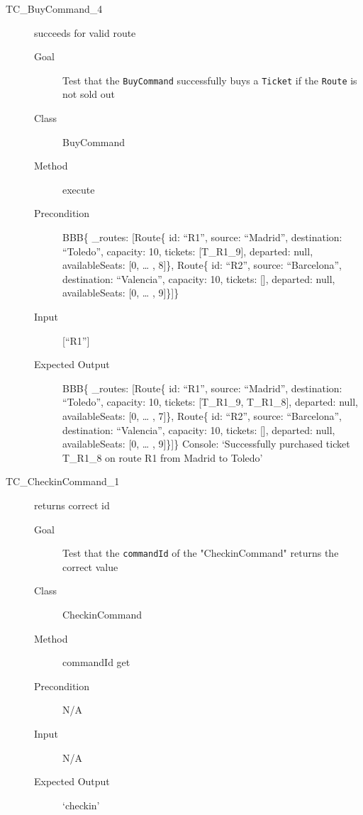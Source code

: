 \documentclass[11pt]{article}
\begin{document}
\begin{description}
\item[{TC\_BuyCommand\_4}] succeeds for valid route
\begin{description}
\item[{Goal}] Test that the \texttt{BuyCommand} successfully buys a \texttt{Ticket} if the \texttt{Route} is not sold out
\item[{Class}] BuyCommand
\item[{Method}] execute
\item[{Precondition}] BBB\{ \_routes: [Route\{ id: “R1”, source: “Madrid”, destination: “Toledo”, capacity: 10,  tickets: [T\_R1\_9], departed: null, availableSeats: [0, … , 8]\}, Route\{ id: “R2”, source: “Barcelona”, destination: “Valencia”, capacity: 10,  tickets: [], departed: null, availableSeats: [0, … , 9]\}]\}
\item[{Input}] [“R1”]
\item[{Expected Output}] BBB\{ \_routes: [Route\{ id: “R1”, source: “Madrid”, destination: “Toledo”, capacity: 10,  tickets: [T\_R1\_9, T\_R1\_8], departed: null, availableSeats: [0, … , 7]\}, Route\{ id: “R2”, source: “Barcelona”, destination: “Valencia”, capacity: 10,  tickets: [], departed: null, availableSeats: [0, … , 9]\}]\}
Console: ‘Successfully purchased ticket T\_R1\_8 on route R1 from Madrid to Toledo’
\end{description}

\item[{TC\_CheckinCommand\_1}] returns correct id
\begin{description}
\item[{Goal}] Test that the \texttt{commandId} of the "CheckinCommand" returns the correct value
\item[{Class}] CheckinCommand
\item[{Method}] commandId get
\item[{Precondition}] N/A
\item[{Input}] N/A
\item[{Expected Output}] ‘checkin’
\end{description}
\end{description}
\end{document}
